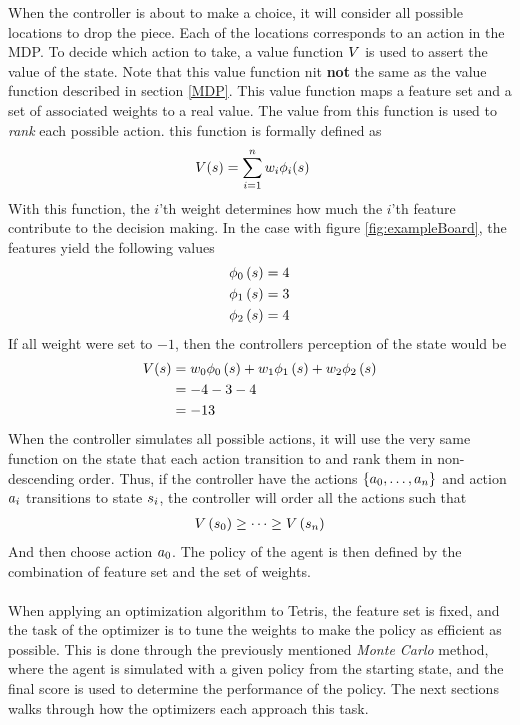 When the controller is about to make a choice, it will
consider all possible locations to drop the piece. Each
of the locations corresponds to an action in the MDP.
To decide which action to take, a value function $V$
is used to assert the value of the state. Note that 
this value function nit \textbf{not} the same as the value 
function described in section \ref{MDP}. This value function
maps a feature set and a set of associated weights to a real value.
The value from this function is used to \textit{rank} each possible action.
this function is formally defined as
\begin{align*}
V (s ) &= 
\sum_{i=1}^{n} w _{i}\phi _{i}(s )
\end{align*}
With this function, the $i$'th weight determines how
much the $i$'th feature contribute to the decision making.
In the case with figure \ref{fig:exampleBoard}, the features yield
the following values
\begin{align*}
\phi_0 \left( s \right) = 4\\
\phi_1 \left( s \right) = 3\\
\phi_2 \left( s \right) = 4
\end{align*}
If all weight were set to $-1$, then the controllers perception 
of the state would be
\begin{align*}
V (s ) &= 
w_0 \phi_0 \left( s \right) + 
w_1 \phi_1 \left( s \right) + 
w_2 \phi_2 \left( s \right)\\
&= -4 -3 -4\\
&= -13
\end{align*}
When the controller simulates all possible actions, it will
use the very same function on the state that each action transition 
to and rank them in non-descending order. Thus, if the controller
have the actions $\{a_0,\dots,a_n\}$ and action 
$a_i$ transitions to state $s_i$, the controller will
order all the actions such that
\begin{align*}
V \left( s_0 \right) \geq \dots \geq 
V \left( s_n \right)
\end{align*} 
And then choose action $a_0$. The policy of the agent 
is then defined by the combination of feature set and the set of weights.\\
\\
When applying an optimization algorithm to Tetris, the feature set is 
fixed, and the task of the optimizer is to tune the weights to make the 
policy as efficient as possible. This is done through the previously 
mentioned \textit{Monte Carlo} method, where the agent is simulated
with a given policy from the starting state, and the final score is 
used to determine the performance of the policy. The next sections 
walks through how the optimizers each approach this task.


